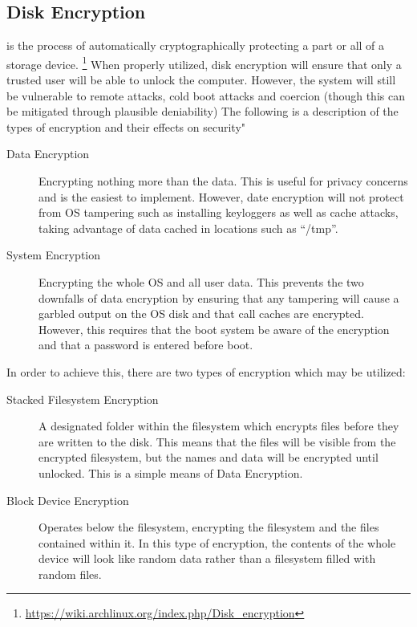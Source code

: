 \documentclass[a4paper,11pt]{report}
\begin{document}
		\subsection{Disk Encryption}
			is the process of automatically cryptographically protecting a part or all of a storage device.
			\footnote{\url{https://wiki.archlinux.org/index.php/Disk\_encryption}}
			When properly utilized, disk encryption will ensure that only a trusted user will be able to unlock the computer. 
			However, the system will still be vulnerable to remote attacks, cold boot attacks and coercion (though this can be mitigated through plausible deniability)
			The following is a description of the types of encryption and their effects on security"
			\begin{description}
				\item[Data Encryption] Encrypting nothing more than the data. 
					This is useful for privacy concerns and is the easiest to implement. 
					However, date encryption will not protect from OS tampering such as installing keyloggers as well as cache attacks, taking advantage of data cached in locations such as ``/tmp''.
				\item[System Encryption] Encrypting the whole OS and all user data. 
					This prevents the two downfalls of data encryption by ensuring that any tampering will cause a garbled output on the OS disk and that call caches are encrypted. 
					However, this requires that the boot system be aware of the encryption and that a password is entered before boot. 
			\end{description}
			In order to achieve this, there are two types of encryption which may be utilized:
			\begin{description}
				\item[Stacked Filesystem Encryption] A designated folder within the filesystem which encrypts files before they are written to the disk. 
					This means that the files will be visible from the encrypted filesystem, but the names and data will be encrypted until unlocked. 
					This is a simple means of Data Encryption. 
				\item[Block Device Encryption] Operates below the filesystem, encrypting the filesystem and the files contained within it. 
					In this type of encryption, the contents of the whole device will look like random data rather than a filesystem filled with random files. 
			\end{description}
\end{document}
